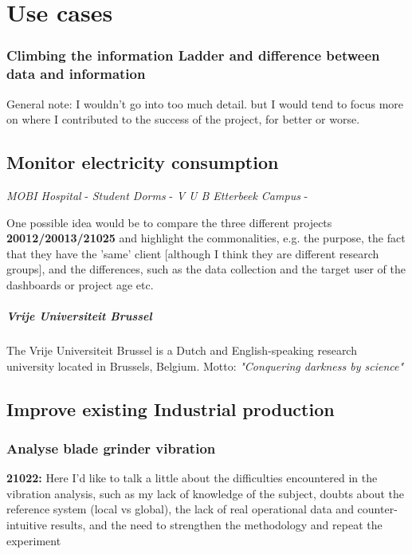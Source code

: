\chapter{Use cases}

\subsection{Climbing the information Ladder and difference between data and information}
General note: I wouldn't go into too much detail. but I would tend to focus more on where I contributed to the success of the project, for better or worse.
\section{Monitor electricity consumption}
\textit{MOBI Hospital} -
\textit{Student Dorms} -
\textit{V U B Etterbeek Campus} -

One possible idea would be to compare the three different projects \textbf{20012/20013/21025} and highlight the commonalities, e.g. the purpose, the fact that they have the 'same' client [although I think they are different research groups], and the differences, such as the data collection and the target user of the dashboards or project age etc.

\paragraph{Vrije Universiteit Brussel}
The Vrije Universiteit Brussel is a Dutch and English-speaking research university located in Brussels, Belgium. Motto: \textit{"Conquering darkness by science"}

\section{Improve existing Industrial production}
\subsection{Analyse blade grinder vibration}
\textbf{21022:} Here I'd like to talk a little about the difficulties encountered in the vibration analysis, such as my lack of knowledge of the subject, doubts about the reference system (local vs global), the lack of real operational data and counter-intuitive results, and the need to strengthen the methodology and repeat the experiment \cite{Misc:stumabo_en_website}

% 
